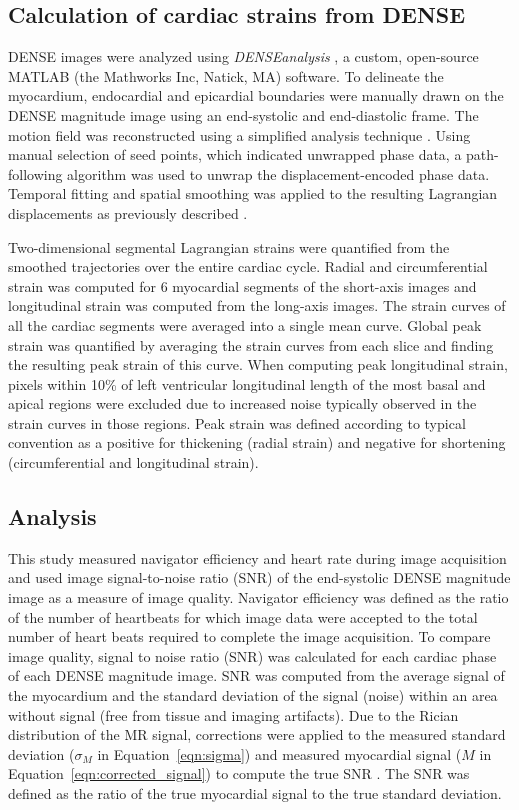 \subsection{Calculation of cardiac strains from DENSE}
	DENSE images were analyzed using \textit{DENSEanalysis} \cite{Gilliam2016a}, a custom, open-source MATLAB (the Mathworks Inc, Natick, MA) software. To delineate the myocardium, endocardial and epicardial boundaries were manually drawn on the DENSE magnitude image using an end-systolic and end-diastolic frame. The motion field was reconstructed using a simplified analysis technique \cite{Suever2014}. Using manual selection of seed points, which indicated unwrapped phase data, a path-following algorithm was used to unwrap the displacement-encoded phase data. Temporal fitting and spatial smoothing was applied to the resulting Lagrangian displacements as previously described \cite{Spottiswoode2007}.
	
	Two-dimensional segmental Lagrangian strains were quantified from the smoothed trajectories over the entire cardiac cycle. Radial and circumferential strain was computed for 6 myocardial segments of the short-axis images and longitudinal strain was computed from the long-axis images. The strain curves of all the cardiac segments were averaged into a single mean curve. Global peak strain was quantified by averaging the strain curves from each slice and finding the resulting peak strain of this curve. When computing peak longitudinal strain, pixels within 10\% of left ventricular longitudinal length of the most basal and apical regions were excluded due to increased noise typically observed in the strain curves in those regions. Peak strain was defined according to typical convention as a positive for thickening (radial strain) and negative for shortening (circumferential and longitudinal strain).

\subsection{Analysis}
	This study measured navigator efficiency and heart rate during image acquisition and used image signal-to-noise ratio (SNR) of the end-systolic DENSE magnitude image as a measure of image quality. Navigator efficiency was defined as the ratio of the number of heartbeats for which image data were accepted to the total number of heart beats required to complete the image acquisition. To compare image quality, signal to noise ratio (SNR) was calculated for each cardiac phase of each DENSE magnitude image. SNR was computed from the average signal of the myocardium and the standard deviation of the signal (noise) within an area without signal (free from tissue and imaging artifacts). Due to the Rician distribution of the MR signal, corrections were applied to the measured standard deviation ($\sigma_M$ in Equation~\ref{eqn:sigma}) and measured myocardial signal ($M$ in Equation~\ref{eqn:corrected_signal}) to compute the true SNR \cite{Wehner2015,Wehner2015a,Gudbjartsson1995}. The SNR was defined as the ratio of the true myocardial signal to the true standard deviation.

